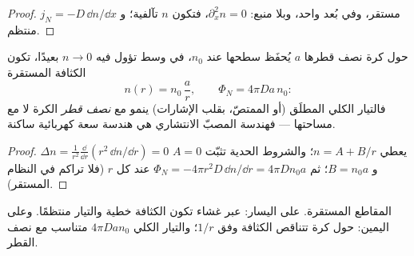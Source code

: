 \begin{proof}
مستقر، وفي بُعد واحد، وبلا منبع: $\partial_x^2 n = 0$، فتكون $n$
تآلفية؛ و $j_N = -D\,\dd n/\dd x$ منتظم.
\end{proof}

\begin{proposition}\label{prop:b2:particle-diffusion:sphere}
حول كرة نصف قطرها $a$ يُحفَظ سطحها عند $n_0$، في
وسط تؤول فيه $n \to 0$ بعيدًا، تكون الكثافة المستقرة
\[
n(r) = n_0\,\frac{a}{r}, \qquad
\Phi_N = 4\pi D a\,n_0 :
\]
فالتيار الكلي المطلَق (أو الممتصّ، بقلب الإشارات) ينمو
مع \emph{نصف قطر} الكرة لا مع مساحتها --- فهندسة
المصبّ الانتشاري هي هندسة سعة كهربائية ساكنة.
\end{proposition}

\begin{proof}
$\Delta n = \frac{1}{r^2}\frac{\dd}{\dd r}(r^2\,\dd n/\dd r) = 0$ يعطي
$n = A + B/r$؛ والشروط الحدية تثبّت $A = 0$ و $B = n_0 a$؛ ثم
$\Phi_N = -4\pi r^2 D\,\dd n/\dd r = 4\pi D n_0 a$ عند كل $r$ (فلا
تراكم في النظام المستقر).
\end{proof}

\begin{omfigure}

{\small المقاطع المستقرة. على اليسار: عبر غشاء تكون الكثافة
خطية والتيار منتظمًا. وعلى اليمين: حول كرة تتناقص الكثافة
وفق $1/r$؛ والتيار الكلي $4\pi D a n_0$ متناسب مع
نصف القطر.}
\end{omfigure}

